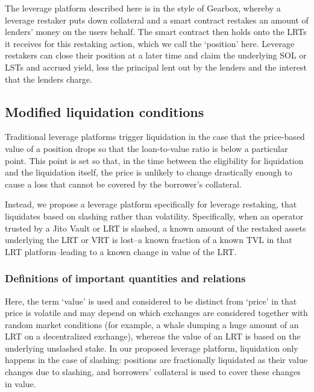 \documentclass{article}
\begin{document}
The leverage platform described here is in the style of Gearbox, whereby a leverage restaker puts down collateral and a smart contract restakes an amount of lenders' money on the users behalf. The smart contract then holds onto the LRTs it receives for this restaking action, which we call the `position' here. Leverage restakers can close their position at a later time and claim the underlying SOL or LSTs and accrued yield, less the principal lent out by the lenders and the interest that the lenders charge.

\subsection{Modified liquidation conditions}
Traditional leverage platforms trigger liquidation in the case that the price-based value of a position drops so that the loan-to-value ratio is below a particular point. This point is set so that, in the time between the eligibility for liquidation and the liquidation itself, the price is unlikely to change drastically enough to cause a loss that cannot be covered by the borrower's collateral.

Instead, we propose a leverage platform specifically for leverage restaking, that liquidates based on slashing rather than volatility. Specifically, when an operator trusted by a Jito Vault or LRT is slashed, a known amount of the restaked assets underlying the LRT or VRT is lost--a known fraction of a known TVL in that LRT platform--leading to a known change in value of the LRT. 

\subsubsection{Definitions of important quantities and relations}
Here, the term `value' is used and considered to be distinct from `price' in that price is volatile and may depend on which exchanges are considered together with random market conditions (for example, a whale dumping a huge amount of an LRT on a decentralized exchange), whereas the value of an LRT is based on the underlying unslashed stake. In our proposed leverage platform, liquidation only happens in the case of slashing: positions are fractionally liquidated as their value changes due to slashing, and borrowers' collateral is used to cover these changes in value.

\end{document}
